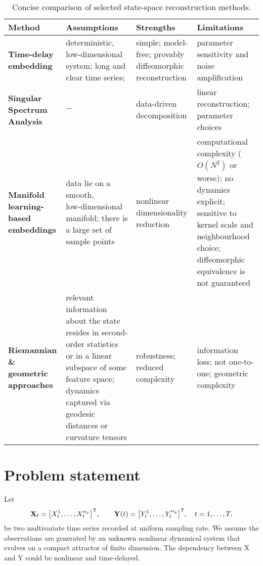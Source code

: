 \documentclass[14pt]{extarticle}
\begin{document}
	\begin{table}[bhtp]
		\centering
		\renewcommand{\arraystretch}{1.25} %
		\begin{tabularx}{\textwidth}{
				>{\raggedright\arraybackslash}p{3.3cm}   %
				>{\raggedright\arraybackslash}X           %
				>{\raggedright\arraybackslash}X           %
				>{\raggedright\arraybackslash}X}          %
			\toprule
			\textbf{Method} & \textbf{Assumptions} & \textbf{Strengths} & \textbf{Limitations} \\
			\midrule
			\textbf{Time-delay embedding} &
			deterministic, low-dimensional system; long and clear time series;  &
			simple; model-free; provably diffeomorphic reconstruction &
			parameter sensitivity and noise amplification \\[0.3em] \hline
			
			\textbf{Singular Spectrum Analysis} &
			$-$ &
			data-driven decomposition &
			linear reconstruction; parameter choices \\[0.3em] \hline
			
			\textbf{Manifold learning-based embeddings} &
			data lie on a smooth, low‑dimensional manifold; there is a large set of sample points &
			nonlinear dimensionality reduction &
			computational complexity ($O(N^2)$ or worse); no dynamics explicit; sensitive to kernel scale and neighbourhood choice; diffeomorphic equivalence is not guaranteed \\[0.3em] \hline
			
			\textbf{Riemannian \& geometric approaches} &
			relevant information about the state resides in second-order statistics or in a linear subspace of some feature space; dynamics captured via geodesic distances or curvature tensors &
			robustness; reduced complexity &
			information loss; not one-to-one; geometric complexity \\
			\bottomrule
		\end{tabularx}
		\caption{Concise comparison of selected state‑space reconstruction methods.}
		\label{tab:ssr_selected}
	\end{table}
	
	\section{Problem statement} \label{sec:problem}
	
	Let
	\[
	\mathbf X_t = \bigl[X_t^1, \ldots, X_t^{n_x}\bigr]^{\mathsf{T}}, \qquad \mathbf Y(t)=\bigl[Y_t^1, \dots, Y_t^{n_y}\bigr]^{\mathsf{T}},
	\quad t=1, \dots, T,
	\]
	be two multivariate time series recorded at uniform sampling rate.
	We assume the observations are generated by an unknown nonlinear dynamical system that evolves on a compact attractor of finite dimension. The dependency between X and Y could be nonlinear and time-delayed.
	
\end{document}
